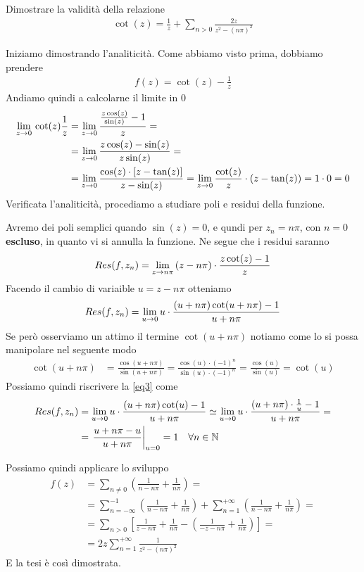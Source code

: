 Dimostrare la validità della relazione
\begin{align}
	\cot(z) = \frac{1}{z} + \sum_{n>0} \frac{2z}{z^2 - (n\pi)^2}
\end{align}

Iniziamo dimostrando l'analiticità. Come abbiamo visto prima, dobbiamo prendere
\begin{align}
	f(z) = \cot(z) - \frac{1}{z}
\end{align}
Andiamo quindi a calcolarne il limite in 0
\begin{align}
	\underset{z \rightarrow 0}{\lim} \, \cot(z) \frac{1}{z} &= \underset{z \rightarrow 0}{\lim} \, \frac{\frac{z\cos(z)}{\sin(z)} -1}{z} = \nonumber\\
	&= \underset{z \rightarrow 0}{\lim} \, \frac{z\cos(z) - \sin(z)}{z\sin (z)} = \nonumber\\
	&= \underset{z \rightarrow 0}{\lim} \,\frac{\cos(z) \cdot [z - \tan (z)]}{z - \sin(z)} = \underset{z \rightarrow 0}{\lim} \, \frac{\cot(z)}{z} \cdot(z-\tan(z)) = 1\cdot 0 = 0
\end{align}
Verificata l'analiticità, procediamo a studiare poli e residui della funzione. 

Avremo dei poli semplici quando $\sin(z) = 0$, e qundi per $z_n=n\pi$, con $n=0$ \textbf{escluso}, in quanto vi si annulla la funzione. Ne segue che i residui saranno
\begin{align}
	Res(f,z_n) = \underset{z \rightarrow n\pi}{\lim} \,  (z-n\pi) \cdot \frac{z\cot(z) -1}{z}
\end{align} 
Facendo il cambio di variaible $u=z-n\pi$ otteniamo
\begin{align}
	Res(f,z_n) = \underset{u \rightarrow 0}{\lim} \, u \cdot \frac{(u+n\pi)\cot(u+n\pi) -1}{u+n\pi} \label{eq3}
\end{align} 
Se però osserviamo un attimo il termine $\cot(u+n\pi)$ notiamo come lo si possa manipolare nel seguente modo
\begin{align}
	\cot(u+n\pi) &= \frac{\cos(u+n\pi)}{\sin(u+n\pi)} = \frac{\cos(u)\cdot(-1)^n}{\sin(u)\cdot(-1)^n} = \frac{\cos(u)}{\sin(u)} = \cot(u)
\end{align}
Possiamo quindi riscrivere la \ref{eq3} come
\begin{align}
	Res(f,z_n) &= \underset{u \rightarrow 0}{\lim} \, u \cdot \frac{(u+n\pi)\cot(u) -1}{u+n\pi} \simeq \underset{u \rightarrow 0}{\lim} \, u\cdot \frac{(u+n\pi)\cdot \frac{1}{u} -1}{u+n\pi} = \nonumber\\
	&= \left. \frac{u+n\pi -u}{u+n\pi} \right|_{u=0} = 1 \quad \forall n\in \mathbb{N}
\end{align} 

Possiamo quindi applicare lo sviluppo
\begin{align}
	f(z) &= \sum_{n\neq 0} \left( \frac{1}{n-n\pi} + \frac{1}{n\pi} \right) = \nonumber\\
		 &= \sum_{n=-\infty}^{-1} \left( \frac{1}{n-n\pi} + \frac{1}{n\pi} \right) + \sum_{n=1}^{+\infty} \left( \frac{1}{n-n\pi} + \frac{1}{n\pi} \right) = \nonumber \\
		 &= \sum_{n>0} \left[ \frac{1}{z-n\pi} + \frac{1}{n\pi} - \left( \frac{1}{-z-n\pi} + \frac{1}{n\pi} \right) \right] = \nonumber\\
		 &= 2z\sum_{n=1}^{+\infty} \frac{1}{z^2 - (n\pi)^2}
\end{align}
E la tesi è così dimostrata.

